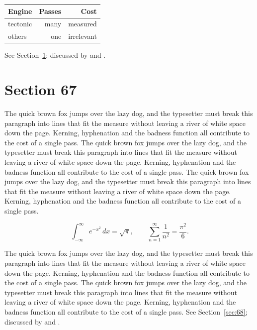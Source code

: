 \documentclass{article}
\begin{document}
\begin{center}
\begin{tabular}{lrr}
\toprule
Engine & Passes & Cost \\
\midrule
tectonic & many & measured \\
others & one & irrelevant \\
\bottomrule
\end{tabular}
\end{center}

See Section~\ref{sec:67}; discussed by \textcite{k2} and \textcite{l4}.
\section{Section 67}
\label{sec:67}
The quick brown fox jumps over the lazy dog, and the typesetter must break this paragraph into lines that fit the measure without leaving a river of white space down the page. Kerning, hyphenation and the badness function all contribute to the cost of a single pass. The quick brown fox jumps over the lazy dog, and the typesetter must break this paragraph into lines that fit the measure without leaving a river of white space down the page. Kerning, hyphenation and the badness function all contribute to the cost of a single pass. The quick brown fox jumps over the lazy dog, and the typesetter must break this paragraph into lines that fit the measure without leaving a river of white space down the page. Kerning, hyphenation and the badness function all contribute to the cost of a single pass. 

\begin{equation}\label{eq:67}
\int_{-\infty}^{\infty} e^{-x^{2}}\,dx = \sqrt{\pi}, \qquad
\sum_{n=1}^{\infty} \frac{1}{n^{2}} = \frac{\pi^{2}}{6}.
\end{equation}

The quick brown fox jumps over the lazy dog, and the typesetter must break this paragraph into lines that fit the measure without leaving a river of white space down the page. Kerning, hyphenation and the badness function all contribute to the cost of a single pass. The quick brown fox jumps over the lazy dog, and the typesetter must break this paragraph into lines that fit the measure without leaving a river of white space down the page. Kerning, hyphenation and the badness function all contribute to the cost of a single pass. 
See Section~\ref{sec:68}; discussed by \textcite{k3} and \textcite{l5}.
\end{document}
